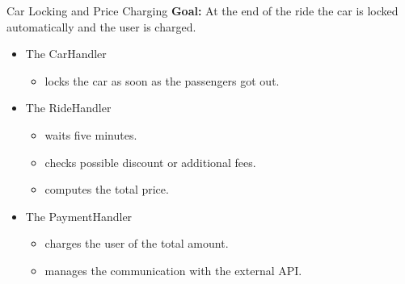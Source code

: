 \documentclass{beamer}
\begin{document}
\begin{frame}{Car Locking and Price Charging}
    \textbf{Goal:} At the end of the ride the car is locked automatically
        and the user is charged.
    \begin{itemize}
        \item The CarHandler
            \begin{itemize}
                \item locks the car as soon as the passengers got out.
            \end{itemize}
        \item The RideHandler
            \begin{itemize}
                \item waits five minutes.
                \item checks possible discount or additional fees.
                \item computes the total price.
            \end{itemize}
        \item The PaymentHandler
            \begin{itemize}
                \item charges the user of the total amount.
                \item manages the communication with the external API.
            \end{itemize}
    \end{itemize}
\end{frame}
\end{document}
